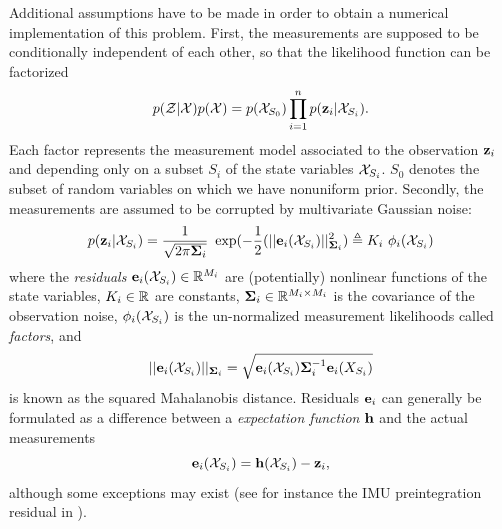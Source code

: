 Additional assumptions have to be made in order to obtain a numerical implementation of this problem.
First, the measurements are supposed to be conditionally independent of each other, so that the likelihood function can be factorized 
%
\begin{equation}
    p(\mathcal{Z} | \mathcal{X}) p(\mathcal{X}) =  p(\mathcal{X}_{S_0}) \prod_{i=1}^{n} p({\bf z}_i | \mathcal{X}_{S_i}).
\end{equation}
%
Each factor represents the measurement model associated to the  observation ${\bf z}_i$ and depending only on a subset $S_i$ of the state variables $\mathcal{X}_{S_i}$. 
$S_0$ denotes the subset of random variables on which we have nonuniform prior.
Secondly, the measurements are assumed to be corrupted by multivariate Gaussian noise:
%
\begin{equation}
    p({\bf z}_i | \mathcal{X}_{S_i}) = \frac{1}{\sqrt{2\pi{\bm \Sigma}_i}} ~ \exp(- \frac{1}{2} (||{\bf e}_i(\mathcal{X}_{S_i})||^2_{{\bm \Sigma}_i}) \triangleq K_i~\phi_i(\mathcal{X}_{S_i})
\end{equation}
%
where the \textit{residuals} ${\bf e}_i(\mathcal{X}_{S_i}) \in \mathbb{R}^{M_i}$ are (potentially) nonlinear functions of the state variables, $K_i \in \mathbb{R}$ are constants, 
${\bm \Sigma}_i \in \mathbb{R}^{M_i \times M_i}$ is the covariance of the observation noise,
$\phi_i(\mathcal{X}_{S_i})$ is the un-normalized measurement likelihoods called \textit{factors}, and 
%
\begin{equation*}
    ||{\bf e}_i(\mathcal{X}_{S_i})||_{{\bm \Sigma}_i} = \sqrt{{\bf e}_i(\mathcal{X}_{S_i}) {\bm \Sigma}_i^{-1} {\bf e}_i(X_{S_i})}
\end{equation*}
%
is known as the squared Mahalanobis distance. 
Residuals ${\bf e}_i$ can generally be formulated as a difference between a \textit{expectation function} ${\bf h}$ and the actual measurements
%
\begin{equation}
    {\bf e}_i(\mathcal{X}_{S_i}) = {\bf h}(\mathcal{X}_{S_i}) - {\bf z}_i,
    \label{eq:error_expectation}
\end{equation}
%
although some exceptions may exist (see for instance the IMU preintegration residual  in ).

